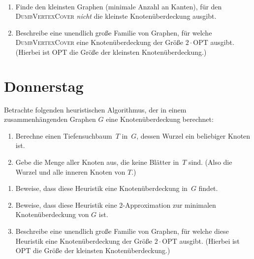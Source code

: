 \documentclass{uebung_cs}
\begin{document}
\begin{aufgabe}\
	\begin{enumerate}
		\item Finde den kleinsten Graphen (minimale Anzahl an Kanten), für den \textsc{DumbVertexCover} \emph{nicht} die kleinste Knotenüberdeckung ausgibt.
		\item Beschreibe eine unendlich große Familie von Graphen, für welche \textsc{DumbVertexCover} eine Knotenüberdeckung der Größe $2 \cdot \mathrm{OPT}$ ausgibt.
		(Hierbei ist $\mathrm{OPT}$ die Größe der kleinsten Knotenüberdeckung.)
	\end{enumerate}
\end{aufgabe}

\section*{Donnerstag}


\begin{aufgabe}
	Betrachte folgenden heuristischen Algorithmus, der in einem zusammenhängenden Graphen $G$ eine Knotenüberdeckung berechnet: 
	\begin{enumerate}[1.,leftmargin=5em]
		\item
		Berechne einen Tiefensuchbaum~$T$ in~$G$, dessen Wurzel ein beliebiger Knoten ist.
		\item
		Gebe die Menge aller Knoten aus, die keine Blätter in~$T$ sind. (Also die Wurzel und alle inneren Knoten von $T$.)
	\end{enumerate}
	\begin{enumerate}
		\item Beweise, dass diese Heuristik eine Knotenüberdeckung in~$G$ findet.
		\item Beweise, dass diese Heuristik eine $2$-Approximation zur minimalen Knotenüberdeckung von $G$ ist.
		\item Beschreibe eine unendlich große Familie von Graphen, für welche diese Heuristik eine Knotenüberdeckung der Größe $2 \cdot \mathrm{OPT}$ ausgibt.
		(Hierbei ist $\mathrm{OPT}$ die Größe der kleinsten Knotenüberdeckung.)
	\end{enumerate}
\end{aufgabe}
\end{document}
